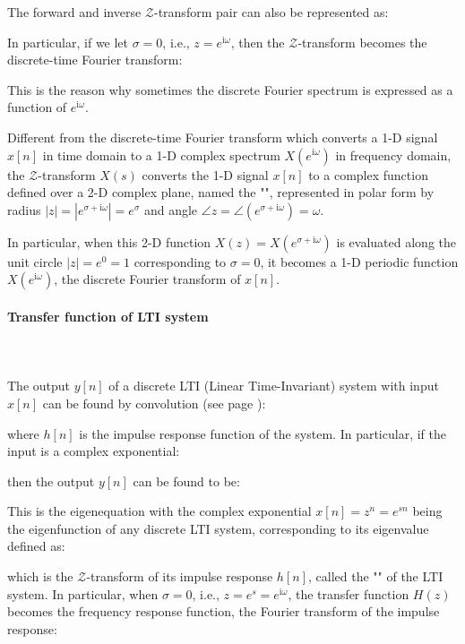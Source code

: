 	
	The forward and inverse $\mathcal{Z}$-transform pair can also be represented as:
	
	In particular, if we let $\sigma=0$, i.e., $z=e^{\mathrm{i}\omega}$, then the $\mathcal{Z}$-transform becomes the discrete-time Fourier transform:
	
	This is the reason why sometimes the discrete Fourier spectrum is expressed as a function of $e^{\mathrm{i}\omega}$.
	
	
	Different from the discrete-time Fourier transform which converts a 1-D signal $x[n]$ in time domain to a 1-D complex spectrum $X(e^{\mathrm{i}\omega})$ in frequency domain, the $\mathcal{Z}$-transform $X(s)$ converts the 1-D signal $x[n]$ to a complex function defined over a 2-D complex plane, named the  "", represented in polar form by radius $|z|=|e^{\sigma+\mathrm{i}\omega}|=e^\sigma$ and angle 
	$\angle z=\angle(e^{\sigma+\mathrm{i}\omega})=\omega$. 
	
	In particular, when this 2-D function $X(z)=X(e^{\sigma+\mathrm{i}\omega})$ is evaluated along the unit circle $|z|=e^0=1$ corresponding to $\sigma=0$, it becomes a 1-D periodic function $X(e^{\mathrm{i}\omega})$, the discrete Fourier transform of $x[n]$. 
	
	\pagebreak
	\paragraph{Transfer function of LTI system}\mbox{}\\\\
	The output $y[n]$ of a discrete LTI (Linear Time-Invariant) system with input $x[n]$ can be found by convolution (see page \pageref{convolution}):
	
	where $h[n]$ is the impulse response function of the system. In 	particular, if the input is a complex exponential:
	
	then the output $y[n]$ can be found to be:
	
	This is the eigenequation with the complex exponential $x[n]=z^n=e^{sn}$ being the eigenfunction of any discrete LTI system, corresponding to its eigenvalue defined as:
	
	which is the $\mathcal{Z}$-transform of its impulse response $h[n]$, called the "" of the LTI system. In particular, when $\sigma=0$, i.e., $z=e^s=e^{\mathrm{i}\omega}$, the transfer function $H(z)$ becomes the frequency response function, the Fourier transform of the impulse response:
	
